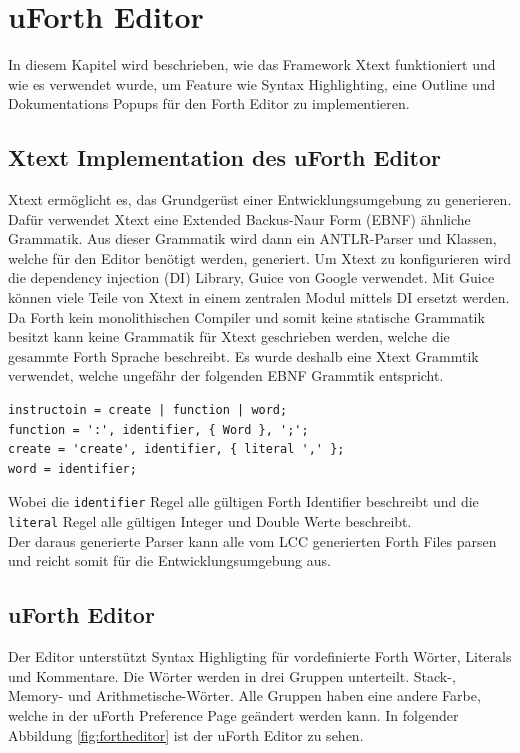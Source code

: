 \chapter{uForth Editor}
\label{chap:fortheditor}
In diesem Kapitel wird beschrieben, wie das Framework Xtext funktioniert und wie es verwendet wurde, um Feature wie Syntax Highlighting, eine Outline und Dokumentations Popups für den Forth Editor zu implementieren.

\section{Xtext Implementation des uForth Editor}
Xtext ermöglicht es, das Grundgerüst einer Entwicklungsumgebung zu generieren. Dafür verwendet Xtext eine Extended Backus-Naur Form (EBNF) ähnliche Grammatik. Aus dieser Grammatik wird dann ein ANTLR-Parser und Klassen, welche für den Editor benötigt werden, generiert. Um Xtext zu konfigurieren wird die dependency injection (DI) Library, Guice von Google verwendet. Mit Guice können viele Teile von Xtext in einem zentralen Modul mittels DI ersetzt werden.\\
Da Forth kein monolithischen Compiler und somit keine statische Grammatik besitzt kann keine Grammatik für Xtext geschrieben werden, welche die gesammte Forth Sprache beschreibt. Es wurde deshalb eine Xtext Grammtik verwendet, welche ungefähr der folgenden EBNF Grammtik entspricht.

\begin{verbatim}
instructoin = create | function | word;
function = ':', identifier, { Word }, ';';
create = 'create', identifier, { literal ',' };
word = identifier;
\end{verbatim}

Wobei die \verb!identifier! Regel alle gültigen Forth Identifier beschreibt und die \verb!literal! Regel alle gültigen Integer und Double Werte beschreibt.
\\
Der daraus generierte Parser kann alle vom LCC generierten Forth Files parsen und reicht somit für die Entwicklungsumgebung aus. 

\newpage
\section{uForth Editor}
Der Editor unterstützt Syntax Highligting für vordefinierte Forth Wörter, Literals und Kommentare. Die Wörter werden in drei Gruppen unterteilt. Stack-, Memory- und Arithmetische-Wörter. Alle Gruppen haben eine andere Farbe, welche in der uForth Preference Page geändert werden kann. In folgender Abbildung \ref{fig:fortheditor} ist der uForth Editor zu sehen.

